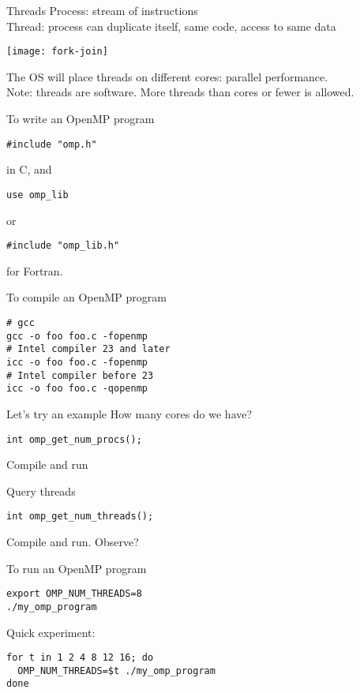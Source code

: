 \begin{numberedframe}{Threads}
  Process: stream of instructions\\
  Thread: process can duplicate itself, same code, access to same data

  \texttt{[image: fork-join]}

  The OS will place threads on different cores: parallel
  performance.\\
  Note: threads are software. More threads than cores or fewer is allowed.
\end{numberedframe}

\begin{numberedframe}{To write an OpenMP program}
\begin{lstlisting}
#include "omp.h"
\end{lstlisting}
in C, and 
\begin{lstlisting}
use omp_lib
\end{lstlisting}
or
\begin{lstlisting}
#include "omp_lib.h"
\end{lstlisting}
for Fortran.  
\end{numberedframe}

\begin{numberedframe}{To compile an OpenMP program}
\begin{verbatim}
# gcc
gcc -o foo foo.c -fopenmp
# Intel compiler 23 and later
icc -o foo foo.c -fopenmp
# Intel compiler before 23 
icc -o foo foo.c -qopenmp
\end{verbatim}
\end{numberedframe}

\begin{numberedframe}{Let's try an example}
  How many cores do we have?
\begin{lstlisting}
int omp_get_num_procs();
\end{lstlisting}
Compile and run
\end{numberedframe}

\begin{numberedframe}{Query threads}
\begin{lstlisting}
int omp_get_num_threads();
\end{lstlisting}
Compile and run. Observe?
\end{numberedframe}

\begin{numberedframe}{To run an OpenMP program}
\begin{verbatim}
export OMP_NUM_THREADS=8
./my_omp_program
\end{verbatim}
Quick experiment:
\begin{verbatim}
for t in 1 2 4 8 12 16; do
  OMP_NUM_THREADS=$t ./my_omp_program
done
\end{verbatim}
\end{numberedframe}

